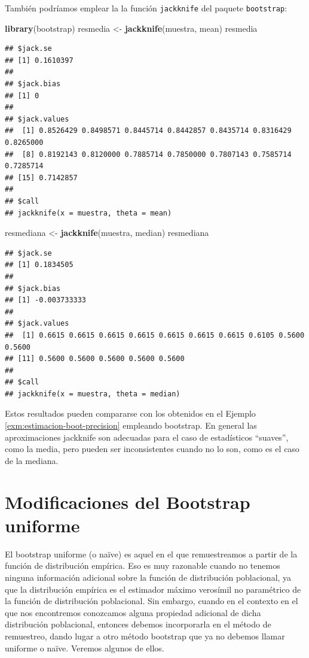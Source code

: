 \documentclass[]{book}
\newenvironment{Shaded}{\begin{snugshade}}{\end{snugshade}}
\newcommand{\KeywordTok}[1]{\textcolor[rgb]{0.13,0.29,0.53}{\textbf{#1}}}
\newcommand{\StringTok}[1]{\textcolor[rgb]{0.31,0.60,0.02}{#1}}
\newcommand{\NormalTok}[1]{#1}
\theoremstyle{definition}
\theoremstyle{definition}
\theoremstyle{definition}
\theoremstyle{remark}
\begin{document}
También podríamos emplear la la función \texttt{jackknife} del paquete
\texttt{bootstrap}:

\begin{Shaded}
\begin{Highlighting}[]
\KeywordTok{library}\NormalTok{(bootstrap)}
\NormalTok{resmedia <-}\StringTok{ }\KeywordTok{jackknife}\NormalTok{(muestra, mean)}
\NormalTok{resmedia}
\end{Highlighting}
\end{Shaded}

\begin{verbatim}
## $jack.se
## [1] 0.1610397
## 
## $jack.bias
## [1] 0
## 
## $jack.values
##  [1] 0.8526429 0.8498571 0.8445714 0.8442857 0.8435714 0.8316429 0.8265000
##  [8] 0.8192143 0.8120000 0.7885714 0.7850000 0.7807143 0.7585714 0.7285714
## [15] 0.7142857
## 
## $call
## jackknife(x = muestra, theta = mean)
\end{verbatim}

\begin{Shaded}
\begin{Highlighting}[]
\NormalTok{resmediana <-}\StringTok{ }\KeywordTok{jackknife}\NormalTok{(muestra, median)}
\NormalTok{resmediana}
\end{Highlighting}
\end{Shaded}

\begin{verbatim}
## $jack.se
## [1] 0.1834505
## 
## $jack.bias
## [1] -0.003733333
## 
## $jack.values
##  [1] 0.6615 0.6615 0.6615 0.6615 0.6615 0.6615 0.6615 0.6105 0.5600 0.5600
## [11] 0.5600 0.5600 0.5600 0.5600 0.5600
## 
## $call
## jackknife(x = muestra, theta = median)
\end{verbatim}

Estos resultados pueden compararse con los obtenidos en el Ejemplo
\ref{exm:estimacion-boot-precision} empleando bootstrap. En general las
aproximaciones jackknife son adecuadas para el caso de estadísticos
``suaves'', como la media, pero pueden ser inconsistentes cuando no lo
son, como es el caso de la mediana.

\chapter{Modificaciones del Bootstrap uniforme}\label{cap4}

El bootstrap uniforme (o naïve) es aquel en el que remuestreamos a
partir de la función de distribución empírica. Eso es muy razonable
cuando no tenemos ninguna información adicional sobre la función de
distribución poblacional, ya que la distribución empírica es el
estimador máximo verosímil no paramétrico de la función de distribución
poblacional. Sin embargo, cuando en el contexto en el que nos
encontremos conozcamos alguna propiedad adicional de dicha distribución
poblacional, entonces debemos incorporarla en el método de remuestreo,
dando lugar a otro método bootstrap que ya no debemos llamar uniforme o
naïve. Veremos algunos de ellos.
\end{document}
